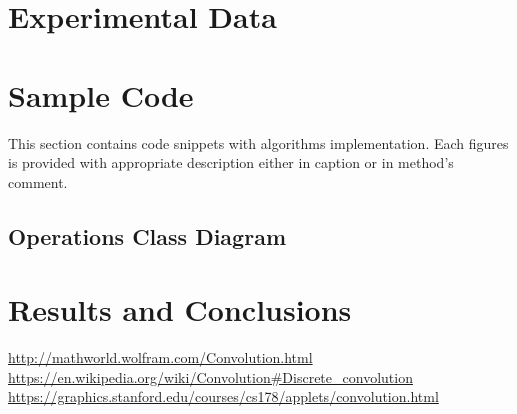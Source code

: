 \documentclass{article}
\begin{document}
 

\section{Experimental Data}



\newpage
\section{Sample Code}
This section contains code snippets with algorithms implementation. Each figures is provided with appropriate description either in caption or in method's comment. 

%
%
\subsection{Operations Class Diagram}





\section{Results and Conclusions}


\newpage

\begin{thebibliography}{1}
	 \url{http://mathworld.wolfram.com/Convolution.html}
	 \url{https://en.wikipedia.org/wiki/Convolution#Discrete_convolution}
	 \url{https://graphics.stanford.edu/courses/cs178/applets/convolution.html}
\end{thebibliography}

\end{document}
